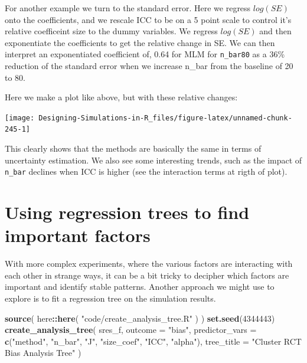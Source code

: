 \documentclass[
]{book}
\newenvironment{Shaded}{\begin{snugshade}}{\end{snugshade}}
\newcommand{\AttributeTok}[1]{\textcolor[rgb]{0.13,0.29,0.53}{#1}}
\newcommand{\DecValTok}[1]{\textcolor[rgb]{0.00,0.00,0.81}{#1}}
\newcommand{\FunctionTok}[1]{\textcolor[rgb]{0.13,0.29,0.53}{\textbf{#1}}}
\newcommand{\NormalTok}[1]{#1}
\newcommand{\SpecialCharTok}[1]{\textcolor[rgb]{0.81,0.36,0.00}{\textbf{#1}}}
\newcommand{\StringTok}[1]{\textcolor[rgb]{0.31,0.60,0.02}{#1}}
\begin{document}
For another example we turn to the standard error.
Here we regress \(log(SE)\) onto the coefficients, and we rescale ICC to be on a 5 point scale to control it's relative coefficeint size to the dummy variables.
We regress \(log(SE)\) and then exponentiate the coefficients to get the relative change in SE.
We can then interpret an exponentiated coefficient of, 0.64 for MLM for \texttt{n\_bar80} as a 36\% reduction of the standard error when we increase n\_bar from the baseline of 20 to 80.

Here we make a plot like above, but with these relative changes:

\begin{center}\texttt{[image: Designing-Simulations-in-R\_files/figure-latex/unnamed-chunk-245-1]} \end{center}

This clearly shows that the methods are basically the same in terms of uncertainty estimation.
We also see some interesting trends, such as the impact of \texttt{n\_bar} declines when ICC is higher (see the interaction terms at rigth of plot).

\section{Using regression trees to find important factors}\label{using-regression-trees-to-find-important-factors}

With more complex experiments, where the various factors are interacting with each other in strange ways, it can be a bit tricky to decipher which factors are important and identify stable patterns.
Another approach we might use to explore is to fit a regression tree on the simulation results.

\begin{Shaded}
\begin{Highlighting}[]
\FunctionTok{source}\NormalTok{( here}\SpecialCharTok{::}\FunctionTok{here}\NormalTok{( }\StringTok{"code/create\_analysis\_tree.R"}\NormalTok{ ) )}
\FunctionTok{set.seed}\NormalTok{(}\DecValTok{4344443}\NormalTok{)}
\FunctionTok{create\_analysis\_tree}\NormalTok{( sres\_f,}
                      \AttributeTok{outcome =} \StringTok{"bias"}\NormalTok{,}
                      \AttributeTok{predictor\_vars =} \FunctionTok{c}\NormalTok{(}\StringTok{"method"}\NormalTok{, }\StringTok{"n\_bar"}\NormalTok{, }\StringTok{"J"}\NormalTok{,}
                                         \StringTok{"size\_coef"}\NormalTok{, }\StringTok{"ICC"}\NormalTok{, }\StringTok{"alpha"}\NormalTok{),}
                      \AttributeTok{tree\_title =} \StringTok{"Cluster RCT Bias Analysis Tree"}\NormalTok{ )}
\end{Highlighting}
\end{Shaded}
\end{document}
